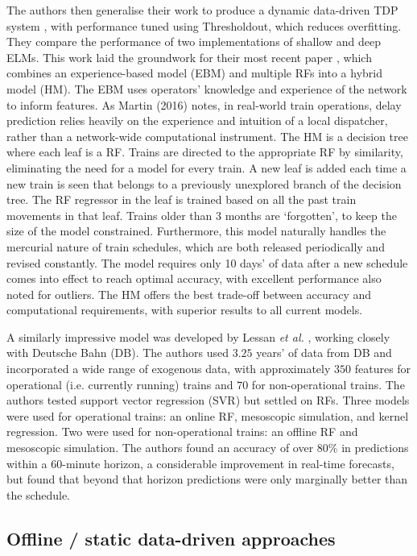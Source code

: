 \documentclass[12pt,a4paper]{article}
\begin{document}
The authors then generalise their work to produce a dynamic data-driven TDP system \cite{oneto_et_al_2017}, with performance tuned using Thresholdout, which reduces overfitting. They compare the performance of two implementations of shallow and deep ELMs. 
This work laid the groundwork for their most recent paper \cite{oneto_et_al_2019}, which combines an experience-based model (EBM) and multiple RFs into a hybrid model (HM). The EBM uses operators’ knowledge and experience of the network to inform features. As Martin (2016) notes, in real-world train operations, delay prediction relies heavily on the experience and intuition of a local dispatcher, rather than a network-wide computational instrument. The HM is a decision tree where each leaf is a RF. Trains are directed to the appropriate RF by similarity, eliminating the need for a model for every train. A new leaf is added each time a new train is seen that belongs to a previously unexplored branch of the decision tree. The RF regressor in the leaf is trained based on all the past train movements in that leaf. Trains older than 3 months are ‘forgotten’, to keep the size of the model constrained. Furthermore, this model naturally handles the mercurial nature of train schedules, which are both released periodically and revised constantly. The model requires only 10 days’ of data after a new schedule comes into effect to reach optimal accuracy, with excellent performance also noted for outliers. The HM offers the best trade-off between accuracy and computational requirements, with superior results to all current models. 

A similarly impressive model was developed by Lessan \textit{et al.} \cite{lessan_fu_wen_2019}, working closely with Deutsche Bahn (DB). The authors used $3.25$ years’ of data from DB and incorporated a wide range of exogenous data, with approximately $350$ features for operational (i.e. currently running) trains and $70$ for non-operational trains. The authors tested support vector regression (SVR) but settled on RFs. Three models were used for operational trains: an online RF, mesoscopic simulation, and kernel regression. Two were used for non-operational trains: an offline RF and mesoscopic simulation. The authors found an accuracy of over $80\%$ in predictions within a $60$-minute horizon, a considerable improvement in real-time forecasts, but found that beyond that horizon predictions were only marginally better than the schedule.

\subsection{Offline / static data-driven approaches}
\end{document}
